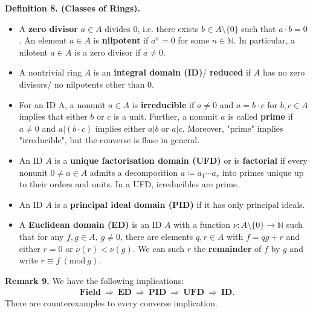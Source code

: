 \documentclass[12pt,a4paper,footinclude=true,headinclude=true]{scrbook} %
\newenvironment{definition}[2][Definition]
    { \begin{mdframed}[backgroundcolor=gray!20] \textbf{#1 #2.}\ }
    {  \end{mdframed}}
\newenvironment{remark}[2][Remark]
    { \begin{mdframed}[backgroundcolor=gray!20] \textbf{#1 #2.} }
    {  \end{mdframed}}
\begin{document}
\begin{definition}{8. (Classes of Rings)}
    \begin{itemize}
        \item[(a)] A \textbf{zero divisor} $a\in A$ divides $0$, i.e. there exists $b\in A\setminus\{0\}$ such that $a\cdot b=0$. An element $a\in A$ is \textbf{nilpotent} if $a^n=0$ for some $n\in\mathbb{N}$. In particular, a nilotent $a\in A$ is a zero divisor if $a\neq0$.
        \item[(b)] A nontrivial ring $A$ is an \textbf{integral domain (ID)}/ \textbf{reduced} if $A$ has no zero divisors/ no nilpotents other than $0$.
        \item[(c)] For an ID A, a nonunit $a\in A$ is \textbf{irreducible} if $a\neq0$ and $a=b\cdot c$ for $b,c\in A$ implies that either $b$ or $c$ is a unit. Further, a nonunit $a$ is called \textbf{prime} if $a\neq0$ and $a|(b\cdot c)$ implies either $a|b$ or $a|c$. Moreover, "prime" implies "irreducible", but the converse is flase in general.
        \item[(d)] An ID $A$ is a \textbf{unique factorisation domain (UFD)} or is \textbf{factorial} if every nonunit $0\neq a\in A$ admits a decomposition $a\coloneqq a_1\cdots a_r$ into primes unique up to their orders and units. In a UFD, irreducibles are prime.
        \item[(e)] An ID $A$ is a \textbf{principal ideal domain (PID)} if it has only principal ideals.
        \item[(f)] A \textbf{Euclidean domain (ED)} is an ID $A$ with a function $\nu:A\setminus\{0\}\to\mathbb{N}$ such that for any $f,g\in A,\ g\neq0$, there are elements $q,r\in A$ with $f=qg+r$ and either $r=0$ or $\nu(r)<\nu(g)$. We can such $r$ the \textbf{remainder} of $f$ by $g$ and write $r\equiv f\ (\mathrm{mod}\ g)$.
    \end{itemize}
\end{definition}

\begin{remark}{9}
    We have the following implications:
    \begin{align*}
        \textbf{Field}\ \Longrightarrow\ \textbf{ED}\ \Longrightarrow\ \textbf{PID}\ \Longrightarrow\ \textbf{UFD}\ \Longrightarrow\ \textbf{ID}.
    \end{align*}
    There are counterexamples to every converse implication.
\end{remark}
\end{document}
